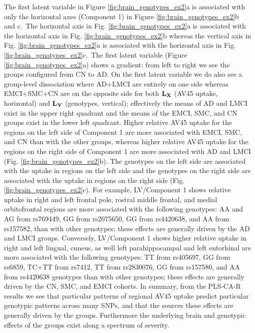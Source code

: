 \documentclass[12pt]{article}
\begin{document}
The first latent variable in Figure \ref{fig:brain_genotypes_ex2}a is
associated with only the horizontal axes (Component 1) in Figure
\ref{fig:brain_genotypes_ex2}b and c.~The horizontal axis in Fig.
\ref{fig:brain_genotypes_ex2}a is associated with the horizontal axis in
Fig. \ref{fig:brain_genotypes_ex2}b whereas the vertical axis in Fig.
\ref{fig:brain_genotypes_ex2}a is associated with the horizontal axis in
Fig. \ref{fig:brain_genotypes_ex2}c.~The first latent variable (Figure
\ref{fig:brain_genotypes_ex2}a) shows a gradient: from left to right we
see the groups configured from CN to AD. On the first latent variable we
do also see a group-level dissociation where AD+LMCI are entirely on one
side whereas EMCI+SMC+CN are on the opposite side for both
\({\bf L}_{\bf X}\) (AV45 uptake, horizontal) and \({\bf L}_{\bf Y}\)
(genotypes, vertical); effectively the means of AD and LMCI exist in the
upper right quadrant and the means of the EMCI, SMC, and CN groups exist
in the lower left quadrant. Higher relative AV45 uptake for the regions
on the left side of Component 1 are more associated with EMCI, SMC, and
CN than with the other groups, whereas higher relative AV45 uptake for
the regions on the right side of Component 1 are more associated with AD
and LMCI (Fig. \ref{fig:brain_genotypes_ex2}b). The genotypes on the
left side are associated with the uptake in regions on the left side and
the genotypes on the right side are associated with the uptake in
regions on the right side (Fig. \ref{fig:brain_genotypes_ex2}c). For
example, LV/Component 1 shows relative uptake in right and left frontal
pole, rostral middle frontal, and medial orbitofrontal regions are more
associated with the following genotypes: AA and AG from rs769449, GG
from rs2075650, GG from rs4420638, and AA from rs157582, than with other
genotypes; these effects are generally driven by the AD and LMCI groups.
Conversely, LV/Component 1 shows higher relative uptake in right and
left lingual, cuneus, as well left parahippocampal and left entorhinal
are more associated with the following genotypes: TT from rs405697, GG
from rs6859, TC+TT from rs7412, TT from rs2830076, GG from rs157580, and
AA from rs4420638 genotypes than with other genotypes; these effects are
generally driven by the CN, SMC, and EMCI cohorts. In summary, from the
PLS-CA-R results we see that particular patterns of regional AV45 uptake
predict particular genotypic patterns across many SNPs, and that the
sources these effects are generally driven by the groups. Furthermore
the underlying brain and genotypic effects of the groups exist along a
spectrum of severity.
\end{document}
